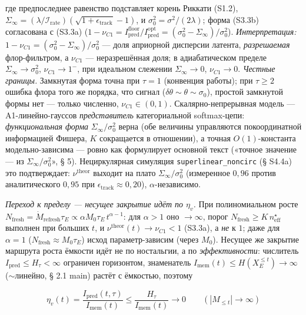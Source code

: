 \documentclass[12pt]{iopart}
\begin{document}
где предпоследнее равенство подставляет корень Риккати (S1.2), \(\Sigma_\infty = (\lambda/\mathcal I_{\text{rate}})(\sqrt{1+\epsilon_{\text{track}}}-1)\), и \(\sigma_0^2 = \sigma^2/(2\lambda)\); форма (S3.3b) согласована с (S3.3a) (\(1-\nu_{C1} = I_{\text{pred}}^{\text{floor}}/I_{\text{pred}}^{\text{opt}} = (\sigma_0^2-\Sigma_\infty)/\sigma_0^2\)). \emph{Интерпретация:} \(1-\nu_{C1} = (\sigma_0^2-\Sigma_\infty)/\sigma_0^2\) --- доля априорной дисперсии латента, \emph{разрешаемая} флор-фильтром, а \(\nu_{C1}\) --- неразрешённая доля; в адиабатическом пределе \(\Sigma_\infty\to\sigma_0^2\), \(\nu_{C1}\to1^-\), при идеальном слежении \(\Sigma_\infty\to0\), \(\nu_{C1}\to0\). \emph{Честные границы.} Замкнутая форма точна при \(\tau = 1\) (конвенция работы); при \(\tau\ge2\) ошибка флора того же порядка, что сигнал (\(\delta\theta\sim\theta\sim\sigma_0\)), простой замкнутой формы нет --- только численно, \(\nu_{C1}\in(0,1)\). Скалярно-непрерывная модель --- A1-линейно-гауссов \emph{представитель} категориальной softmax-цепи: \emph{функциональная форма} \(\Sigma_\infty/\sigma_0^2\) верна (обе величины управляются покоординатной информацией Фишера, \(K\) сокращается в отношении), а точная \(O(1)\)-константа модельно-зависима --- ровно как формулирует основной текст («точное значение --- из \(\Sigma_\infty/\sigma_0^2\)», § 5). Нециркулярная симуляция \texttt{superlinear\_noncirc} (§ S4.4a) это подтверждает: \(\nu^{\text{theor}}\) выходит на плато \(\Sigma_\infty/\sigma_0^2\) (измеренное \(0{,}96\) против аналитического \(0{,}95\) при \(\epsilon_{\text{track}} \approx 0{,}20\)), \(\alpha\)-независимо.



\emph{Переход к пределу --- несущее закрытие идёт по \(\eta_v\).} При полиномиальном росте \(N_{\text{fresh}} = \dot M_{\text{refresh}}\tau_E \propto \alpha M_0\tau_E\,t^{\alpha-1}\): для \(\alpha > 1\) оно \(\to \infty\), порог \(N_{\text{fresh}} \ge K\,n_{\text{eff}}^\star\) выполнен при больших \(t\), и \(\nu^{\text{theor}}(t) \to \nu_{C1} < 1\) (S3.3a), а \emph{не} к \(1\); даже для \(\alpha = 1\) (\(N_{\text{fresh}} \approx M_0\tau_E\)) исход параметр-зависим (через \(M_0\)). Несущее же закрытие маршрута роста ёмкости идёт не по ностальгии, а по \emph{эффективности}: числитель \(I_{\text{pred}} \le H_\tau < \infty\) ограничен горизонтом, знаменатель \(I_{\text{mem}}(t) \le H(X_E^{\le t}) \to \infty\) (\(\sim\)линейно, § 2.1 main) растёт с ёмкостью, поэтому



\[\eta_v(t) = \frac{I_{\text{pred}}(t,\tau)}{I_{\text{mem}}(t)} \le \frac{H_\tau}{I_{\text{mem}}(t)} \to 0 \qquad (|M_{\le t}| \to \infty)\]
\end{document}
